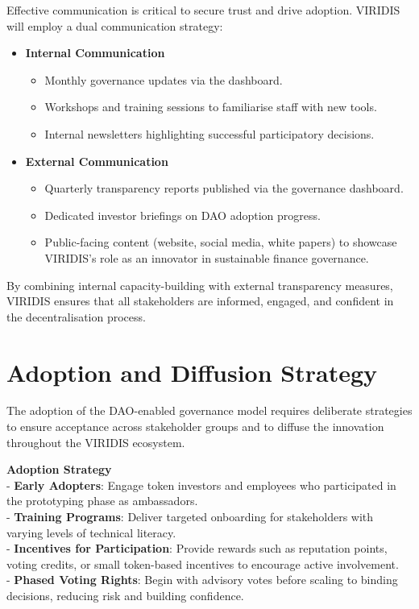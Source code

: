 \documentclass[
  english,
  12pt,
  oneside,
  open=any]{scrbook}
\providecommand{\tightlist}{%
  \setlength{\itemsep}{0pt}\setlength{\parskip}{0pt}}\usepackage{longtable,booktabs,array}
\begin{document}
Effective communication is critical to secure trust and drive adoption.
VIRIDIS will employ a dual communication strategy:

\begin{itemize}
\tightlist
\item
  \textbf{Internal Communication}

  \begin{itemize}
  \tightlist
  \item
    Monthly governance updates via the dashboard.\\
  \item
    Workshops and training sessions to familiarise staff with new
    tools.\\
  \item
    Internal newsletters highlighting successful participatory
    decisions.
  \end{itemize}
\item
  \textbf{External Communication}

  \begin{itemize}
  \tightlist
  \item
    Quarterly transparency reports published via the governance
    dashboard.\\
  \item
    Dedicated investor briefings on DAO adoption progress.\\
  \item
    Public-facing content (website, social media, white papers) to
    showcase VIRIDIS's role as an innovator in sustainable finance
    governance.
  \end{itemize}
\end{itemize}

By combining internal capacity-building with external transparency
measures, VIRIDIS ensures that all stakeholders are informed, engaged,
and confident in the decentralisation process.

\section{Adoption and Diffusion Strategy}\label{sec-adoption}

The adoption of the DAO-enabled governance model requires deliberate
strategies to ensure acceptance across stakeholder groups and to diffuse
the innovation throughout the VIRIDIS ecosystem.

\textbf{Adoption Strategy}\\
- \textbf{Early Adopters}: Engage token investors and employees who
participated in the prototyping phase as ambassadors.\\
- \textbf{Training Programs}: Deliver targeted onboarding for
stakeholders with varying levels of technical literacy.\\
- \textbf{Incentives for Participation}: Provide rewards such as
reputation points, voting credits, or small token-based incentives to
encourage active involvement.\\
- \textbf{Phased Voting Rights}: Begin with advisory votes before
scaling to binding decisions, reducing risk and building confidence.
\end{document}
